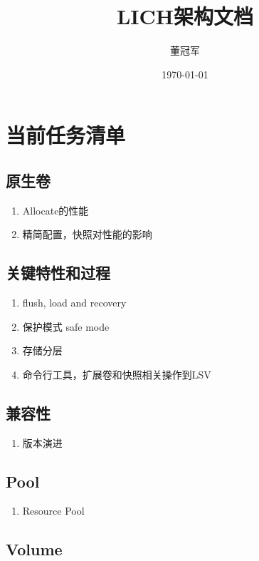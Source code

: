 \documentclass[UTF8]{ctexart}
\title{LICH架构文档}
\author{董冠军}
\date{\today}
\begin{document}
\maketitle
\tableofcontents

\section{当前任务清单}

\subsection{原生卷}

\begin{enumerate}
    \item Allocate的性能
    \item 精简配置，快照对性能的影响
\end{enumerate}

\subsection{关键特性和过程}

\begin{enumerate}
    \item flush, load and recovery
    \item 保护模式 safe mode
    \item 存储分层
    \item 命令行工具，扩展卷和快照相关操作到LSV
\end{enumerate}

\subsection{兼容性}

\begin{enumerate}
    \item 版本演进
\end{enumerate}

\subsection{Pool}

\begin{enumerate}
    \item Resource Pool
\end{enumerate}

\subsection{Volume}
\end{document}
